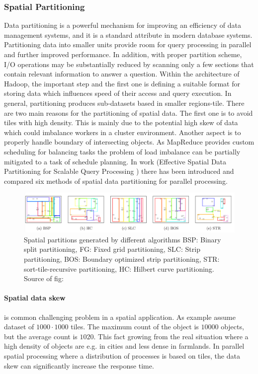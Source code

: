 \documentclass[a4paper,12pt,oneside]{report}
\begin{document}
	\subsubsection{Spatial Partitioning}
	\label{Spatial_Data_Partitioning}
	Data partitioning is a powerful mechanism for improving an efficiency of data
	management systems, 
	and it is a standard attribute in modern database systems. Partitioning data
	into smaller units provide room for query processing in parallel and further
	improved performance. In addition,
	with proper partition scheme, I/O operations may be substantially
	reduced by scanning only a few sections that contain relevant information to
	answer a question.
	Within the architecture of Hadoop, the important step and the first one is defining a
	suitable format for 
	storing data which influences  speed of their access and query execution.
	In general,
	partitioning produces sub-datasets based in smaller regions-tile.
	There are two main reasons for the partitioning of spatial data. 
	The first one is to avoid tiles with high density. This is mainly due to the
	potential high 
	skew\cite{spatial_skew} of data which could imbalance workers in a cluster
	environment. Another aspect is to  
	properly handle boundary of intersecting objects. As MapReduce provides custom
	scheduling  for balancing tasks the problem of load imbalance can be partially 
	mitigated to a task of schedule planning. In work (Effective Spatial Data
	Partitioning for Scalable Query 
	Processing \cite{partitioning}) there has been introduced and compared six methods of
	spatial data partitioning for parallel processing. 
	
	\begin{figure}[h!]
		\centering
		\includegraphics[width=1\textwidth]{./img/part_overview.png}
		\caption[Spatial partitioning]{\centering  Spatial partitions generated by
			different algorithms BSP: Binary split 
			partitioning, FG: Fixed grid
			partitioning, SLC: Strip partitioning, BOS: Boundary optimized strip
			partitioning, STR: sort-tile-recursive
			partitioning, HC: Hilbert curve partitioning. Source of fig:
			\cite{partitioning}}
	\end{figure} 
	
	\paragraph{Spatial data skew} is common challenging problem in a spatial
	application. As example \cite{hadoopGIS} assume dataset of 
	$1000\cdot1000$ tiles. The maximum count of the object is $10 000$ objects, but
	the average count is $1020$. This 
	fact growing from the real situation where a high density of objects are e.g. in
	cities and less dense in farmlands. 
	In parallel spatial processing where a distribution of processes is based on
	tiles, the data skew can significantly 
	increase the response time.
	
\end{document}
